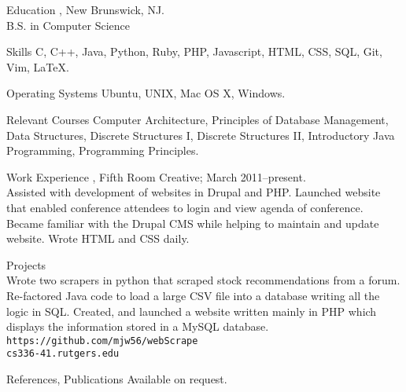 \documentclass{resume}
\author{~~~~~~Michael J. Wilcox}
\begin{document}
\maketitle


\begin{category}{Education}
, New Brunswick, NJ.\\
B.S. in Computer Science
\end{category}

\begin{category}{Skills}
\citemnobullet 
C, C++, Java, Python, Ruby, PHP, Javascript, HTML, CSS, SQL, Git, Vim, \LaTeX.
\end{category}

\begin{category}{Operating Systems}
\citemnobullet
Ubuntu, UNIX, Mac OS X, Windows.\\
\end{category}

\begin{category}{Relevant Courses}
\citemnobullet
Computer Architecture, Principles of Database Management, Data Structures, Discrete Structures I, Discrete Structures II, Introductory Java Programming, Programming Principles.\\
\end{category}

\begin{category}{Work Experience}
, Fifth Room Creative;
March 2011--present.\\
Assisted with development of websites in Drupal and PHP. Launched website that enabled conference attendees to login and view agenda of conference. Became familiar with the Drupal CMS while helping to maintain and update website. Wrote HTML and CSS daily. %
\end{category}

\begin{category}{Projects}
\\
Wrote two scrapers in python that scraped stock recommendations from a forum. Re-factored Java code to load a large CSV file into a database writing all the logic in SQL. Created, and launched a website written mainly in PHP which displays the information stored in a MySQL database. \\
\mbox{\small\tt https://github.com/mjw56/webScrape}\\
\mbox{\small\tt cs336-41.rutgers.edu}
\end{category}


\begin{category}{References, Publications} 
\citemnobullet Available on request.
\end{category}
\end{document}
